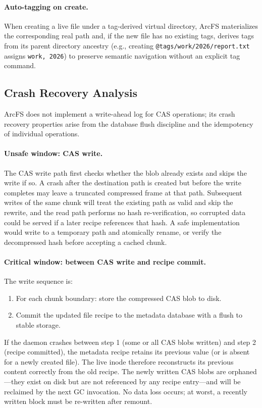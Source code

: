 \documentclass[5p,times]{elsarticle}
\begin{document}
\paragraph{Auto-tagging on create.}
When creating a live file under a tag-derived virtual directory, ArcFS
materializes the corresponding real path and, if the new file has no
existing tags, derives tags from its parent directory ancestry (e.g.,
creating \texttt{@tags/work/2026/report.txt} assigns \texttt{work, 2026})
to preserve semantic navigation without an explicit tag command.

\subsection{Crash Recovery Analysis}
\label{sec:crash}

ArcFS does not implement a write-ahead log for CAS operations; its crash
recovery properties arise from the database flush discipline and the
idempotency of individual operations.

\paragraph{Unsafe window: CAS write.}
The CAS write path first checks whether the blob already exists and
skips the write if so.  A crash after the destination path is created
but before the write completes may leave a truncated compressed frame
at that path.  Subsequent writes of the same chunk will treat the
existing path as valid and skip the rewrite, and the read path performs
no hash re-verification, so corrupted data could be served if a later
recipe references that hash.  A safe implementation would write to a
temporary path and atomically rename, or verify the decompressed hash
before accepting a cached chunk.

\paragraph{Critical window: between CAS write and recipe commit.}
The write sequence is:
\begin{enumerate}
\item For each chunk boundary: store the compressed CAS blob to disk.
\item Commit the updated file recipe to the metadata database with a
  flush to stable storage.
\end{enumerate}
If the daemon crashes between step 1 (some or all CAS blobs written)
and step 2 (recipe committed), the metadata recipe retains its previous value (or is absent for a
newly created file).  The live inode
therefore reconstructs its previous content correctly from the old
recipe.  The newly written CAS blobs are orphaned—they exist on disk but
are not referenced by any recipe entry---and will be reclaimed by the
next GC invocation.  No data loss occurs; at worst,
a recently written block must be re-written after remount.
\end{document}
